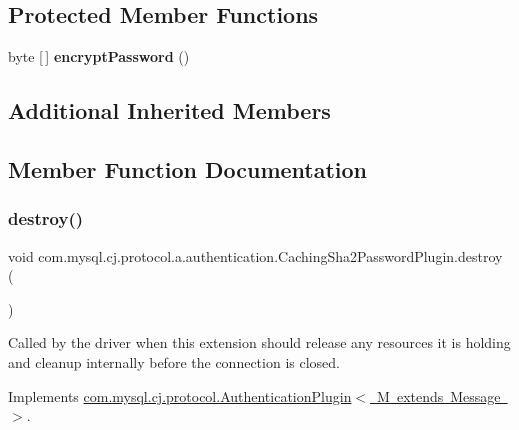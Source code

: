 \subsection*{Protected Member Functions}
\begin{DoxyCompactItemize}
\item 
\mbox{\label{classcom_1_1mysql_1_1cj_1_1protocol_1_1a_1_1authentication_1_1_caching_sha2_password_plugin_a805d910174ec1cd3fba30624ff667e72}} 
byte \mbox{[}$\,$\mbox{]} {\bfseries encrypt\+Password} ()
\end{DoxyCompactItemize}
\subsection*{Additional Inherited Members}


\subsection{Member Function Documentation}
\mbox{\label{classcom_1_1mysql_1_1cj_1_1protocol_1_1a_1_1authentication_1_1_caching_sha2_password_plugin_ae1487e57db91585f60ffa884c6f10a54}} 
\subsubsection{\texorpdfstring{destroy()}{destroy()}}
{\footnotesize\ttfamily void com.\+mysql.\+cj.\+protocol.\+a.\+authentication.\+Caching\+Sha2\+Password\+Plugin.\+destroy (\begin{DoxyParamCaption}{ }\end{DoxyParamCaption})}

Called by the driver when this extension should release any resources it is holding and cleanup internally before the connection is closed. 

Implements \mbox{\hyperlink{interfacecom_1_1mysql_1_1cj_1_1protocol_1_1_authentication_plugin_a1978dd8a16052ae403299d59a4412ac8}{com.\+mysql.\+cj.\+protocol.\+Authentication\+Plugin$<$ M extends Message $>$}}.

